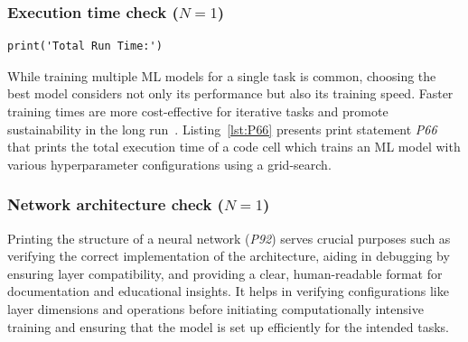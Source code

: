 
\subsubsection{Execution time check ($N = 1$)}
\begin{lstlisting}[caption={Print statement \emph{P66} used to check the total execution time of training an ML model with various hyper-parameter configurations.}, label={lst:P66}]
print('Total Run Time:')
\end{lstlisting}

While training multiple ML models for a single task is common, choosing the best model considers not only its performance but also its training speed. Faster training times are more cost-effective for iterative tasks and promote sustainability in the long run~\cite{shome2022data}. Listing~\ref{lst:P66} presents print statement \emph{P66} that prints the total execution time of a code cell which trains an ML model with various hyperparameter configurations using a grid-search. 


\subsubsection{Network architecture check ($N = 1$)}

Printing the structure of a neural network (\emph{P92}) serves crucial purposes such as verifying the correct implementation of the architecture, aiding in debugging by ensuring layer compatibility, and providing a clear, human-readable format for documentation and educational insights. It helps in verifying configurations like layer dimensions and operations before initiating computationally intensive training and ensuring that the model is set up efficiently for the intended tasks.

